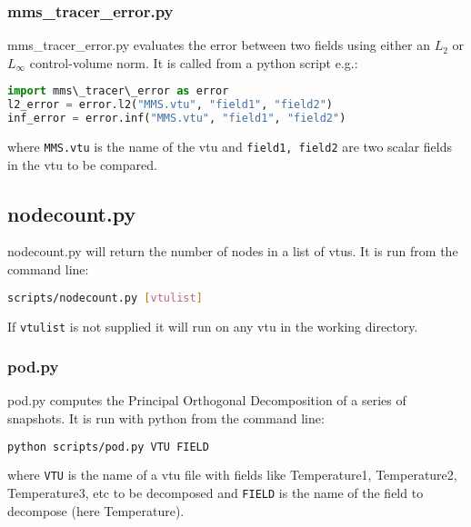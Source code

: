 
\subsubsection{mms\_tracer\_error.py}
\label{sect:mms_tracer_error}

mms\_tracer\_error.py evaluates the error between two fields using either an $L_2$ or $L_\infty$ control-volume norm. It is called from a python script e.g.:
\begin{lstlisting}[language = python]
import mms\_tracer\_error as error
l2_error = error.l2("MMS.vtu", "field1", "field2")
inf_error = error.inf("MMS.vtu", "field1", "field2")
\end{lstlisting}
where \lstinline[language = python]+MMS.vtu+ is the name of the vtu and \lstinline[language = python]+field1, field2+ are two scalar fields in the vtu to be compared.


\subsection{nodecount.py}
\label{sect:nodecount}
nodecount.py will return the number of nodes in a list of vtus. It is run from the command line:
\begin{lstlisting}[language = Bash]
scripts/nodecount.py [vtulist]
\end{lstlisting}
If \lstinline[language = Bash]+vtulist+ is not supplied it will run on any vtu in the working directory.


\subsubsection{pod.py}
\label{sect:scripts_pod}
pod.py computes the Principal Orthogonal Decomposition of a series of snapshots. It is run with python from the command line:
\begin{lstlisting}[language = Bash]
python scripts/pod.py VTU FIELD
\end{lstlisting}
where \lstinline[language = Bash]+VTU+ is the name of a vtu file with fields like Temperature1, Temperature2, Temperature3, etc to be decomposed and \lstinline[language = Bash]+FIELD+ is the name of the field to decompose (here Temperature). 

